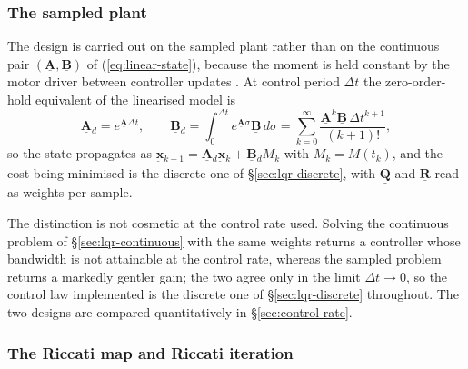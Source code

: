 \documentclass[12pt]{article}
\newcommand{\vb}[1]{{\underset{\tilde{}}{\mathbf{#1}}}}
\newcommand{\mb}[1]{\underline{\mathbf{#1}}}
\begin{document}
\subsubsection{The sampled plant}
\label{sec:sampled-plant}

The design is carried out on the sampled plant rather than on the continuous pair $(\mb{A}, \mb{B})$ of (\ref{eq:linear-state}), because the moment is held constant by the motor driver between controller updates \cite{AstromWittenmark2011}. At control period $\Delta t$ the zero-order-hold equivalent of the linearised model is
\[
\mb{A}{}_d = e^{\mb{A}\Delta t}, \qquad
\mb{B}{}_d = \int_0^{\Delta t} e^{\mb{A}\sigma}\mb{B}\, d\sigma
= \sum_{k=0}^{\infty} \frac{\mb{A}^k \mb{B}\,\Delta t^{k+1}}{(k+1)!},
\]
so the state propagates as $\vb{x}{}_{k+1} = \mb{A}{}_d\vb{x}{}_k + \mb{B}{}_d M_k$ with $M_k = M(t_k)$, and the cost being minimised is the discrete one of \S\ref{sec:lqr-discrete}, with $\mb{Q}$ and $\mb{R}$ read as weights per sample.

The distinction is not cosmetic at the control rate used. Solving the continuous problem of \S\ref{sec:lqr-continuous} with the same weights returns a controller whose bandwidth is not attainable at the control rate, whereas the sampled problem returns a markedly gentler gain; the two agree only in the limit $\Delta t \to 0$, so the control law implemented is the discrete one of \S\ref{sec:lqr-discrete} throughout. The two designs are compared quantitatively in \S\ref{sec:control-rate}.


\subsubsection{The Riccati map and Riccati iteration}
\label{sec:riccati-iteration}
\end{document}
